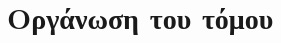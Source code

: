 \section{Οργάνωση του τόμου}

\begin{comment}
Η εργασία αυτή είναι οργανωμένη σε επτά κεφάλαια: Στο Κεφάλαιο 2
δίνεται το θεωρητικό υπόβαθρο των βασικών τεχνολογιών που
σχετίζονται με τη διπλωματική αυτή. Αρχικά περιγράφονται τα δίκτυα
ομότιμων κόμβων, στη συνέχεια το πλαίσιο \en{RDF} και τέλος
δίνεται μια μελέτη των γλωσσών ερωτήσεων για \en{RDF}. Στο
Κεφάλαιο 3 αρχικά περιγράφονται οι σχετικές με το θέμα εργασίες
και στη συνέχεια δίνεται ο στόχος της συγκεκριμένης εργασίας. Στο
Κεφάλαιο 4 παρουσιάζεται η ανάλυση και η σχεδίαση του συστήματος,
δηλαδή η περιγραφή των υποσυστημάτων και των εφαρμογών του. Η
περιγραφή της υλοποίησης του συστήματος, με ανάλυση των βασικών
αλγορίθμων καθώς και λεπτομέρειες σχετικά με τις πλατφόρμες και τα
προγραμματιστικά εργαλεία που χρησιμοποιήθηκαν δίνεται στο
Κεφάλαιο 5. Στο Κεφάλαιο 6 παρουσιάζεται ο έλεγχος καλής
λειτουργίας του συστήματος με βάση ένα συγκεκριμένο σενάριο
χρήσης. Τέλος στο Κεφάλαιο 7 δίνεται η συνεισφορά αυτής της
διπλωματικής εργασίας, καθώς και μελλοντικές επεκτάσεις.
\end{comment}